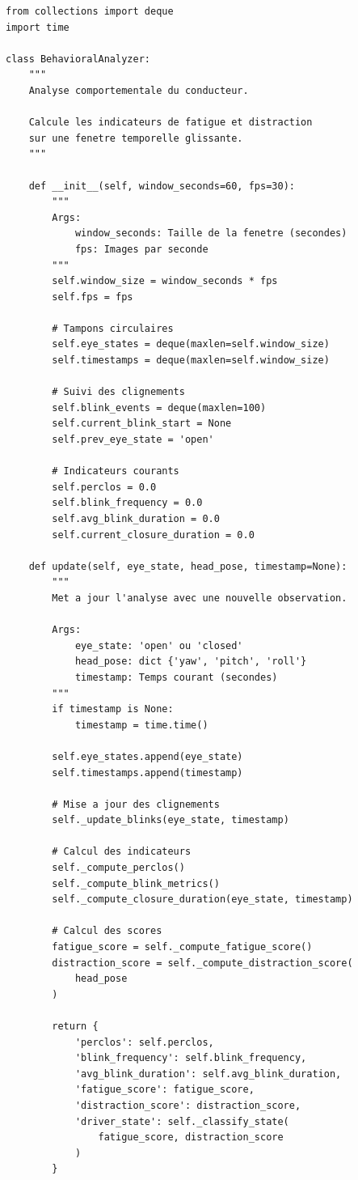 \begin{lstlisting}[style=pythonstyle, caption={Module d'analyse comportementale.}, label={lst:behavioral}]
from collections import deque
import time

class BehavioralAnalyzer:
    """
    Analyse comportementale du conducteur.
    
    Calcule les indicateurs de fatigue et distraction
    sur une fenetre temporelle glissante.
    """
    
    def __init__(self, window_seconds=60, fps=30):
        """
        Args:
            window_seconds: Taille de la fenetre (secondes)
            fps: Images par seconde
        """
        self.window_size = window_seconds * fps
        self.fps = fps
        
        # Tampons circulaires
        self.eye_states = deque(maxlen=self.window_size)
        self.timestamps = deque(maxlen=self.window_size)
        
        # Suivi des clignements
        self.blink_events = deque(maxlen=100)
        self.current_blink_start = None
        self.prev_eye_state = 'open'
        
        # Indicateurs courants
        self.perclos = 0.0
        self.blink_frequency = 0.0
        self.avg_blink_duration = 0.0
        self.current_closure_duration = 0.0
    
    def update(self, eye_state, head_pose, timestamp=None):
        """
        Met a jour l'analyse avec une nouvelle observation.
        
        Args:
            eye_state: 'open' ou 'closed'
            head_pose: dict {'yaw', 'pitch', 'roll'}
            timestamp: Temps courant (secondes)
        """
        if timestamp is None:
            timestamp = time.time()
        
        self.eye_states.append(eye_state)
        self.timestamps.append(timestamp)
        
        # Mise a jour des clignements
        self._update_blinks(eye_state, timestamp)
        
        # Calcul des indicateurs
        self._compute_perclos()
        self._compute_blink_metrics()
        self._compute_closure_duration(eye_state, timestamp)
        
        # Calcul des scores
        fatigue_score = self._compute_fatigue_score()
        distraction_score = self._compute_distraction_score(
            head_pose
        )
        
        return {
            'perclos': self.perclos,
            'blink_frequency': self.blink_frequency,
            'avg_blink_duration': self.avg_blink_duration,
            'fatigue_score': fatigue_score,
            'distraction_score': distraction_score,
            'driver_state': self._classify_state(
                fatigue_score, distraction_score
            )
        }
    

\end{lstlisting}
